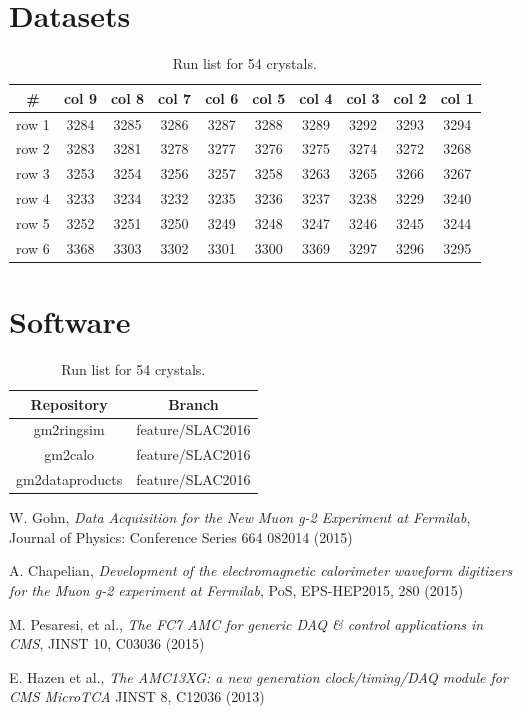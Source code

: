 \section{Datasets}

\begin{table}[htbp]
\centering
\caption{Run list for 54 crystals.}
\begin{tabular}{|c|c|c|c|c|c|c|c|c|c|}
\hline 
\#    & col 9 & col 8 & col 7 & col 6 & col 5 & col 4 & col 3 & col 2 & col 1 \\
\hline
row 1 & 3284  & 3285  & 3286  & 3287  & 3288  & 3289  & 3292  & 3293  & 3294  \\
\hline
row 2 & 3283  & 3281  & 3278  & 3277  & 3276  & 3275  & 3274  & 3272  & 3268  \\
\hline
row 3 & 3253  & 3254  & 3256  & 3257  & 3258  & 3263  & 3265  & 3266  & 3267  \\
\hline
row 4 & 3233  & 3234  & 3232  & 3235  & 3236  & 3237  & 3238  & 3229  & 3240  \\
\hline
row 5 & 3252  & 3251  & 3250  & 3249  & 3248  & 3247  & 3246  & 3245  & 3244  \\
\hline
row 6 & 3368  & 3303  & 3302  & 3301  & 3300  & 3369  & 3297  & 3296  & 3295 \\
\hline
\end{tabular} 
\label{tab:runlist}
\end{table}

\section{Software}
\begin{table}[htbp]
\centering
\caption{Run list for 54 crystals.}
\begin{tabular}{|c|c|}
\hline 
Repository & Branch \\
\hline
gm2ringsim & feature/SLAC2016 \\
\hline
gm2calo & feature/SLAC2016 \\
\hline
gm2dataproducts & feature/SLAC2016 \\
\hline
\end{tabular} 
\label{tab:software}
\end{table}


\begin{thebibliography}{99}

W. Gohn, \emph{Data Acquisition for the New Muon g-2 Experiment at Fermilab},
Journal of Physics: Conference Series 664 082014 (2015) 

A. Chapelian, \emph{Development of the electromagnetic calorimeter waveform digitizers for the Muon g-2 experiment at Fermilab},
PoS, EPS-HEP2015, 280 (2015)

M. Pesaresi, et al., \emph{The FC7 AMC for generic DAQ \& control applications in CMS},
JINST 10, C03036 (2015)

E. Hazen et al., \emph{The AMC13XG: a new generation clock/timing/DAQ module for CMS MicroTCA}
JINST 8, C12036 (2013)

\end{thebibliography}



